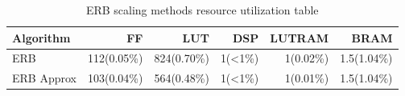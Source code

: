 \begin{table}[H]
    \centering
\begin{tabular}{ !{\color{ytblborder}\vrule}l!{\color{ytblborder}\vrule}rrrrr| } 
    \hline

    \hline
     \color{white}\bf{Algorithm} 
    & \color{white}\bf{FF} 
    & \color{white}\bf{LUT} 
    & \color{white}\bf{DSP} 
    & \color{white}\bf{LUTRAM} 
    & \color{white}\bf{BRAM} \\
    \hline

    \hline
     ERB   & 112(0.05\%) & 824(0.70\%) & 1(<1\%) & 1(0.02\%) & 1.5(1.04\%)  \\
    \hline
    
    \hline
     ERB Approx      & 103(0.04\%) & 564(0.48\%) & 1(<1\%) & 1(0.01\%)  & 1.5(1.04\%)    \\
    \hline

    \hline
\end{tabular}
\caption{ERB scaling methods resource utilization table}
\label{tbl:ERB_resource_util}
\end{table}


